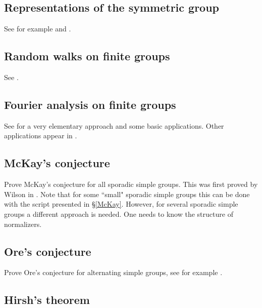 \subsection*{Representations of the symmetric group}

See for example \cite[\S10]{MR2867444} and 
\cite{MR1153249}. 

\subsection*{Random walks on finite groups}

See \cite[\S11]{MR2867444}.

\subsection*{Fourier analysis on finite groups}

See \cite[\S5]{MR2867444} for a very elementary approach and some
basic applications. Other applications 
appear in \cite{MR1695775}.

\subsection*{McKay's conjecture}

Prove McKay's conjecture for all sporadic simple groups. 
This was first proved by Wilson in \cite{MR1643110}. 
Note that
for some ``small" sporadic simple groups this can be done
with the script presented in \S\ref{McKay}. However, 
for several sporadic simple groups a different approach is needed. One needs
to know the structure of normalizers. 

\subsection*{Ore's conjecture}

Prove Ore's conjecture for alternating simple groups,
see for example \cite{MR40298}. 

\subsection*{Hirsh's theorem}

